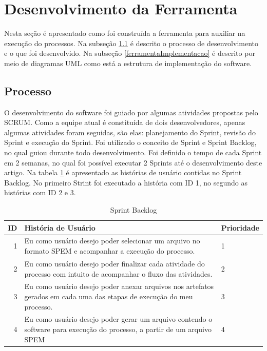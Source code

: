 \section{Desenvolvimento da Ferramenta}\label{ferramentaDeModelagemColabvorativa}
Nesta seção é apresentado como foi construída a ferramenta para auxiliar na execução do processos. Na subseção \ref{ferramentaProcesso} é descrito o processo de desenvolvimento e o que foi desenvolvido. Na subseção \ref{ferramentaImplementacao} é descrito por meio de diagramas UML como está a estrutura de implementação do software.
\subsection{Processo}\label{ferramentaProcesso}
O desenvolvimento do software foi guiado por algumas atividades propostas pelo SCRUM. Como a equipe atual é constituída de dois desenvolvedores, apenas algumas atividades foram seguidas, são elas: planejamento do Sprint, revisão do Sprint e execução do Sprint.
Foi utilizado o conceito de Sprint e Sprint Backlog, no qual guiou durante todo desenvolvimento. Foi definido o tempo de cada Sprint em 2 semanas, no qual foi possível executar 2 Sprints até o desenvolvimento deste artigo. Na tabela \ref{sprintbacklog} é apresentado as histórias de usuário contidas no Sprint Backlog. No primeiro Strint foi executado a história com ID 1, no segundo as histórias com ID 2 e 3.
\begin{table}[!htb]
	\centering
	\caption{Sprint Backlog}
		\label{sprintbacklog}
	\vspace{0.5cm}
	\begin{tabular}{r|p{11cm}|p{2cm}}
		
		ID & História de Usuário & Prioridade \\ %
		\hline                               %
		1 & Eu como usuário desejo poder selecionar um arquivo no formato SPEM e acompanhar a execução do processo.        & 1 \\
				\hline 
		2 & Eu como usuário desejo poder finalizar cada atividade do processo com intuito de acompanhar o fluxo das atividades.  & 2 \\
				\hline 
		3 & Eu como usuário desejo poder anexar arquivos nos artefatos gerados em cada uma das etapas de execução do meu processo.           & 3 \\
				\hline 
		4 & Eu como usuário desejo poder gerar um arquivo contendo o software para execução do processo, a partir de um arquivo SPEM        & 4 \\         %
		
	\end{tabular}
\end{table}

